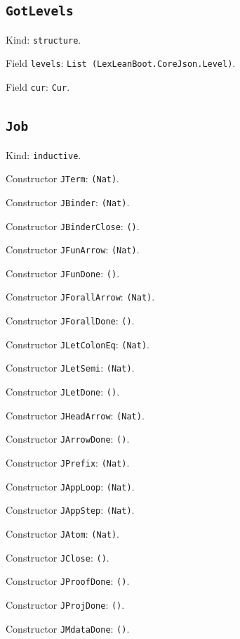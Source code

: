 \documentclass[11pt]{article}
\begin{document}
\subsection*{\texttt{GotLevels}}
\noindent Kind: \texttt{structure}.\par
\noindent Field \texttt{levels}: \texttt{List (LexLeanBoot.CoreJson.Level)}.\par
\noindent Field \texttt{cur}: \texttt{Cur}.\par
\subsection*{\texttt{Job}}
\noindent Kind: \texttt{inductive}.\par
\noindent Constructor \texttt{JTerm}: \texttt{(Nat)}.\par
\noindent Constructor \texttt{JBinder}: \texttt{(Nat)}.\par
\noindent Constructor \texttt{JBinderClose}: \texttt{()}.\par
\noindent Constructor \texttt{JFunArrow}: \texttt{(Nat)}.\par
\noindent Constructor \texttt{JFunDone}: \texttt{()}.\par
\noindent Constructor \texttt{JForallArrow}: \texttt{(Nat)}.\par
\noindent Constructor \texttt{JForallDone}: \texttt{()}.\par
\noindent Constructor \texttt{JLetColonEq}: \texttt{(Nat)}.\par
\noindent Constructor \texttt{JLetSemi}: \texttt{(Nat)}.\par
\noindent Constructor \texttt{JLetDone}: \texttt{()}.\par
\noindent Constructor \texttt{JHeadArrow}: \texttt{(Nat)}.\par
\noindent Constructor \texttt{JArrowDone}: \texttt{()}.\par
\noindent Constructor \texttt{JPrefix}: \texttt{(Nat)}.\par
\noindent Constructor \texttt{JAppLoop}: \texttt{(Nat)}.\par
\noindent Constructor \texttt{JAppStep}: \texttt{(Nat)}.\par
\noindent Constructor \texttt{JAtom}: \texttt{(Nat)}.\par
\noindent Constructor \texttt{JClose}: \texttt{()}.\par
\noindent Constructor \texttt{JProofDone}: \texttt{()}.\par
\noindent Constructor \texttt{JProjDone}: \texttt{()}.\par
\noindent Constructor \texttt{JMdataDone}: \texttt{()}.\par
\end{document}
